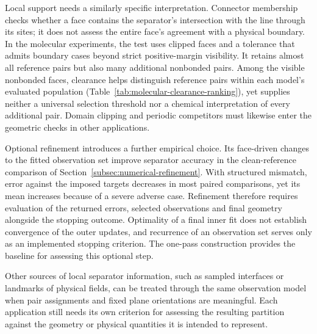 Local support needs a similarly specific interpretation. Connector membership checks whether a face contains the separator's intersection with the line through its sites; it does not assess the entire face's agreement with a physical boundary. In the molecular experiments, the test uses clipped faces and a tolerance that admits boundary cases beyond strict positive-margin visibility. It retains almost all reference pairs but also many additional nonbonded pairs. Among the visible nonbonded faces, clearance helps distinguish reference pairs within each model's evaluated population (Table~\ref{tab:molecular-clearance-ranking}), yet supplies neither a universal selection threshold nor a chemical interpretation of every additional pair. Domain clipping and periodic competitors must likewise enter the geometric checks in other applications.

Optional refinement introduces a further empirical choice. Its face-driven changes to the fitted observation set improve separator accuracy in the clean-reference comparison of Section~\ref{subsec:numerical-refinement}. With structured mismatch, error against the imposed targets decreases in most paired comparisons, yet its mean increases because of a severe adverse case. Refinement therefore requires evaluation of the returned errors, selected observations and final geometry alongside the stopping outcome. Optimality of a final inner fit does not establish convergence of the outer updates, and recurrence of an observation set serves only as an implemented stopping criterion. The one-pass construction provides the baseline for assessing this optional step.

Other sources of local separator information, such as sampled interfaces or landmarks of physical fields, can be treated through the same observation model when pair assignments and fixed plane orientations are meaningful. Each application still needs its own criterion for assessing the resulting partition against the geometry or physical quantities it is intended to represent.
